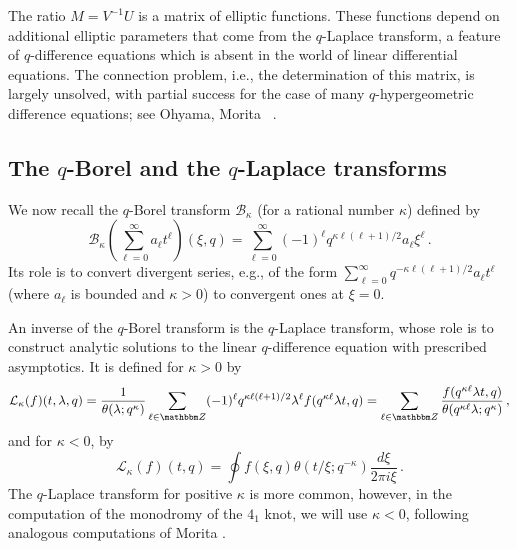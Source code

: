 \documentclass[12pt,reqno]{amsart}
\theoremstyle{definition}
\def\BZ{\mathbbm Z}
\def\be{\begin{equation}}
\def\ee{\end{equation}}
\def\Bor{\mathcal{B}}
\def\Lap{\mathcal{L}}
\begin{document}
The ratio $M = V^{-1} U$ is a matrix of elliptic functions. These functions depend
on additional elliptic parameters that come from the $q$-Laplace transform,
a feature of $q$-difference equations which is absent in the world of linear
differential equations. The connection problem, i.e., the determination of this
matrix, is largely unsolved, with partial success for the case of many
$q$-hypergeometric difference equations; see Ohyama, Morita
~\cite{Morita:stokes-qdiff, Morita:stokes-rama,Ohyama:talk,Ohyama:connection}. 

\subsection{The $q$-Borel and the $q$-Laplace transforms}
\label{sub.qborel}

We now recall the $q$-Borel transform $\Bor_\kappa$ (for a rational number $\kappa$)
defined by
\be
\label{qborel}
\Bor_{\kappa}\left(\sum_{\ell=0}^{\infty}a_{\ell}t^{\ell}\right)(\xi,q)
=
\sum_{\ell=0}^{\infty}(-1)^{\ell}q^{\kappa \ell(\ell+1)/2}a_{\ell}\xi^{\ell}\,.
\ee
Its role is to convert divergent series, e.g., of the form
$\sum_{\ell=0}^\infty q^{-\kappa \ell(\ell+1)/2}a_{\ell}t^{\ell}$ (where $a_\ell$
is bounded and $\kappa>0$) to convergent ones at $\xi=0$. 


An inverse of the $q$-Borel transform is the $q$-Laplace transform, whose role
is to construct analytic solutions to the linear $q$-difference equation
with prescribed asymptotics. It is defined for $\kappa>0$ by
\be
\label{qlap}
\Lap_{\kappa}(f)(t,\lambda,q)
=
\frac{1}{\theta(\lambda;q^\kappa)}\sum_{\ell\in\BZ}(-1)^{\ell}
q^{\kappa\ell(\ell+1)/2}\lambda^{\ell}f(q^{\kappa\ell}\lambda t,q)
=
\sum_{\ell\in\BZ}
\frac{f(q^{\kappa\ell}\lambda t,q)}{\theta(q^{\kappa\ell}\lambda;q^\kappa)}\, ,
\ee
and for $\kappa<0$, by
\be
\Lap_{\kappa}(f)(t,q)=\oint f(\xi,q)\theta(t/\xi;q^{-\kappa})
\frac{d\xi}{2\pi i\xi} \,.
\ee
The $q$-Laplace transform for positive $\kappa$ is more common, however, in
the computation of the monodromy of the $4_1$ knot, we will use $\kappa <0$,
following analogous computations of Morita \cite{Morita:conn-mon}.
\end{document}
